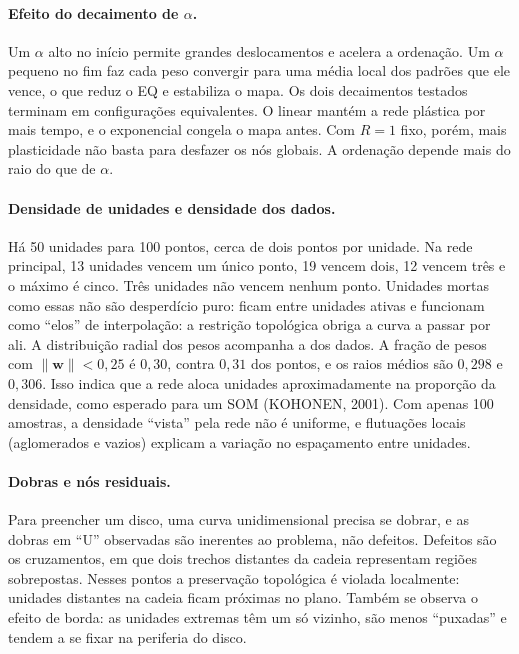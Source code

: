 \documentclass[12pt,a4paper,oneside]{article}
\begin{document}
\paragraph{Efeito do decaimento de $\alpha$.} Um $\alpha$ alto no início
permite grandes deslocamentos e acelera a ordenação. Um $\alpha$ pequeno no
fim faz cada peso convergir para uma média local dos padrões que ele vence,
o que reduz o EQ e estabiliza o mapa. Os dois decaimentos testados terminam
em configurações equivalentes. O linear mantém a rede plástica por mais
tempo, e o exponencial congela o mapa antes. Com $R=1$ fixo, porém, mais
plasticidade não basta para desfazer os nós globais. A ordenação depende
mais do raio do que de $\alpha$.

\paragraph{Densidade de unidades e densidade dos dados.} Há 50 unidades para
100 pontos, cerca de dois pontos por unidade. Na rede principal, 13 unidades
vencem um único ponto, 19 vencem dois, 12 vencem três e o máximo é cinco.
Três unidades não vencem nenhum ponto. Unidades mortas como essas não
são desperdício puro: ficam entre unidades ativas e funcionam como
``elos'' de interpolação: a restrição topológica obriga a curva a passar por
ali. A distribuição radial dos pesos acompanha a dos dados. A fração de
pesos com $\|\mathbf{w}\|<0{,}25$ é $0{,}30$, contra $0{,}31$ dos pontos,
e os raios médios são $0{,}298$ e $0{,}306$. Isso indica que a rede aloca
unidades aproximadamente na proporção da densidade, como esperado para
um SOM (KOHONEN, 2001). Com apenas 100 amostras, a densidade ``vista'' pela
rede não é uniforme, e flutuações locais (aglomerados e vazios) explicam a
variação no espaçamento entre unidades.

\paragraph{Dobras e nós residuais.} Para preencher um disco, uma curva
unidimensional precisa se dobrar, e as dobras em ``U'' observadas são
inerentes ao problema, não defeitos. Defeitos são os cruzamentos, em que dois
trechos distantes da cadeia representam regiões sobrepostas. Nesses pontos a
preservação topológica é violada localmente: unidades distantes na cadeia
ficam próximas no plano. Também se observa o efeito de borda: as unidades
extremas têm um só vizinho, são menos ``puxadas'' e tendem a se fixar na
periferia do disco.
\end{document}
